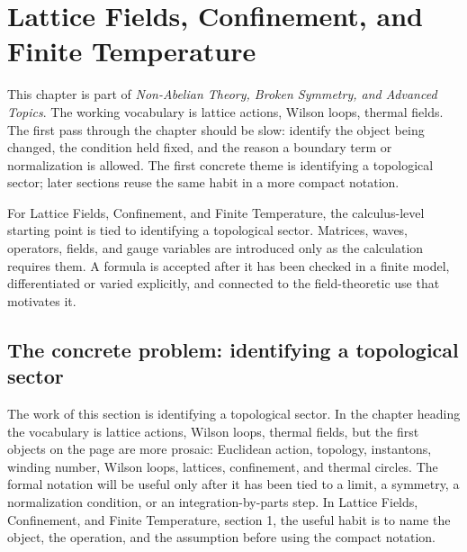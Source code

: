 \chapter{Lattice Fields, Confinement, and Finite Temperature}


This chapter is part of \emph{Non-Abelian Theory, Broken Symmetry, and Advanced Topics}.  The working vocabulary is lattice actions, Wilson loops, thermal fields.  The first pass through the chapter should be slow: identify the object being changed, the condition held fixed, and the reason a boundary term or normalization is allowed.  The first concrete theme is identifying a topological sector; later sections reuse the same habit in a more compact notation.

For Lattice Fields, Confinement, and Finite Temperature, the calculus-level starting point is tied to identifying a topological sector.  Matrices, waves, operators, fields, and gauge variables are introduced only as the calculation requires them.  A formula is accepted after it has been checked in a finite model, differentiated or varied explicitly, and connected to the field-theoretic use that motivates it.

\section{The concrete problem: identifying a topological sector}













The work of this section is identifying a topological sector.  In the chapter heading the vocabulary is lattice actions, Wilson loops, thermal fields, but the first objects on the page are more prosaic: Euclidean action, topology, instantons, winding number, Wilson loops, lattices, confinement, and thermal circles.  The formal notation will be useful only after it has been tied to a limit, a symmetry, a normalization condition, or an integration-by-parts step.  In Lattice Fields, Confinement, and Finite Temperature, section 1, the useful habit is to name the object, the operation, and the assumption before using the compact notation.

